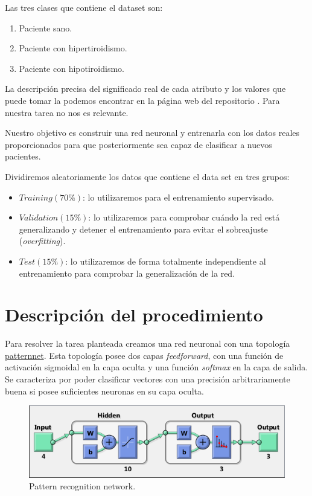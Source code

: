 \documentclass[a4paper,12pt,titlepage]{article}
\begin{document}
\newpage

Las tres clases que contiene el dataset son:

\begin{enumerate}[noitemsep]
	\item Paciente sano.
	\item Paciente con hipertiroidismo.
	\item Paciente con hipotiroidismo.
\end{enumerate}

La descripción precisa del significado real de cada atributo y los valores que puede tomar la podemos encontrar en la página web del repositorio \citep{Asuncion+Newman:2007}. Para nuestra tarea no nos es relevante.

Nuestro objetivo es construir una red neuronal y entrenarla con los datos reales proporcionados para que posteriormente sea capaz de clasificar a nuevos pacientes. 

Dividiremos aleatoriamente los datos que contiene el data set en tres grupos:

\begin{itemize}[noitemsep]
	\item $Training (70\%)$: lo utilizaremos para el entrenamiento supervisado.
	\item $Validation (15\%)$: lo utilizaremos para comprobar cuándo la red está generalizando y detener el entrenamiento para evitar el sobreajuste (\textit{overfitting}).
	\item $Test (15\%)$: lo utilizaremos de forma totalmente independiente al entrenamiento para comprobar la generalización de la red.
\end{itemize}

\section{Descripción del procedimiento}

Para resolver la tarea planteada creamos una red neuronal con una topología \href{http://www.mathworks.com/help/nnet/ref/patternnet.html}{patternnet}. Esta topología posee dos capas \textit{feedforward}, con una función de activación sigmoidal en la capa oculta y una función \textit{softmax} en la capa de salida. Se caracteriza por poder clasificar vectores con una precisión arbitrariamente buena si posee suficientes neuronas en su capa oculta.

\begin{figure}[!ht]
	\centering
	\label{fig:patternnet}
	\includegraphics[width=\textwidth]{patternnet.png}
	\caption{Pattern recognition network.}
\end{figure}
\end{document}
